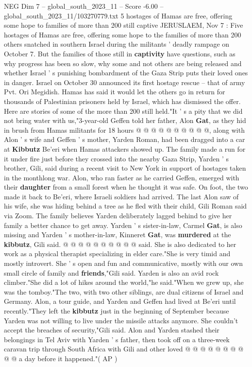 \begin{textsample}{NEG Dim 7 – global\_south\_2023\_11 – Score -6.00 – global\_south\_2023\_11/103270779.txt}  \label{ex:f7_neg_329}
5 hostages of Hamas are free, offering some hope to families of more than 200 still captive JERUSLAEM, Nov 7 : Five hostages of Hamas are free, offering some hope to the families of more than 200 others snatched in southern Israel during the militants ' deadly rampage on October 7.
But the families of those still in \textbf{captivity} have questions, such as why progress has been so slow, why some and not others are being released and whether Israel ' s punishing bombardment of the Gaza Strip puts their loved ones in danger.
Israel on October 30 announced its first hostage rescue -- that of army Pvt.
Ori Megidish.
Hamas has said it would let the others go in return for thousands of Palestinian prisoners held by Israel, which has dismissed the offer.
Here are stories of some of the more than 200 still held."It ' s a pity that we did not bring water with us,"3-year-old Geffen told her father, Alon \textbf{Gat}, as they hid in brush from Hamas militants for 18 hours @ @ @ @ @ @ @ @ @ @, along with Alon ' s wife and Geffen ' s mother, Yarden Roman, had been dragged into a car at \textbf{Kibbutz} Be'eri when Hamas attackers showed up.
The family made a run for it under fire just before they crossed into the nearby Gaza Strip, Yarden ' s brother, Gili, said during a recent visit to New York in support of hostages taken in the monthlong war.
Alon, who ran faster as he carried Geffen, emerged with their \textbf{daughter} from a small forest when he thought it was safe.
On foot, the two made it back to Be'eri, where Israeli soldiers had arrived.
The last Alon saw of his wife, she was hiding behind a tree as he fled with their child, Gili Roman said via Zoom.
The family believes Yarden deliberately lagged behind to give her family a better chance to get away.
Yarden ' s sister-in-law, Carmel \textbf{Gat}, is also missing and Yarden ' s mother-in-law, Kinneret \textbf{Gat}, was \textbf{murdered} at the \textbf{kibbutz}, Gili said. @ @ @ @ @ @ @ @ @ @ said.
She is also dedicated to her work as a physical therapist specializing in elder care."She is very timid and mostly introvert.
She ' s open and fun and communicative, mostly with our own small circle of family and \textbf{friends},"Gili said.
Yarden is also an avid rock climber."She did a lot of hikes around the world,"he said."When we grew up, she was the tomboy."The two, with two other siblings, are dual citizens of Israel and Germany.
Alon, a tour guide, and Yarden and Geffen had lived at Be'eri until recently."They left the \textbf{kibbutz} just in the beginning of September because Yarden was not willing to live under the missile attacks anymore.
She couldn't accept the breaches of security,"Gili said.
Alon and Yarden stashed their belongings in Tel Aviv with Yarden ' s father, then took off on a three-week caravan trip through South Africa with Gili and other loved @ @ @ @ @ @ @ @ @ @ a day before it happened."( AP )

\end{textsample}
